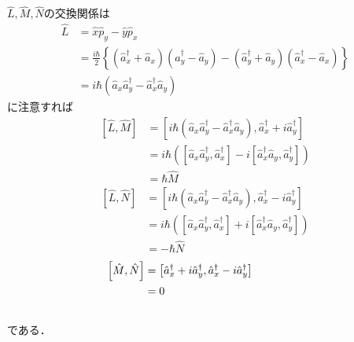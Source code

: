 \documentclass[a4paper,pdflatex,ja=standard]{bxjsarticle}
\begin{document}
\begin{enumerate}
  $\hat{L},\hat{M},\hat{N}$の交換関係は
  \begin{align}
    \hat{L}
    &=
    \hat{x}\hat{p}_{y}
    -
    \hat{y}\hat{p}_{x}
    \nonumber
    \\
    &=
    \frac{i\hbar}{2}\left\{
    (\hat{a}_{x}^{\dagger}+\hat{a}_{x})(\hat{a}_{y}^{\dagger}-\hat{a}_{y})
    -
    (\hat{a}_{y}^{\dagger}+\hat{a}_{y})(\hat{a}_{x}^{\dagger}-\hat{a}_{x})
    \right\}
    \nonumber
    \\
    &=
    i\hbar(\hat{a}_{x}\hat{a}_{y}^{\dagger}-\hat{a}_{x}^{\dagger}\hat{a}_{y})
    \label{ang_momentum}
  \end{align}
  に注意すれば
  \begin{align}
    \left[  
      \hat{L},\hat{M}
    \right]
    &=
    \left[  
      i\hbar(\hat{a}_{x}\hat{a}_{y}^{\dagger}-\hat{a}_{x}^{\dagger}\hat{a}_{y})
      ,
      \hat{a}_{x}^{\dagger}
      +i\hat{a}_{y}^{\dagger}
    \right]
    \nonumber
    \\
    &=
    i\hbar
    \left(  
      \left[ \hat{a}_{x}\hat{a}_{y}^{\dagger},\hat{a}_{x}^{\dagger} \right]
      -
      i\left[ \hat{a}_{x}^{\dagger}\hat{a}_{y},\hat{a}_{y}^{\dagger} \right]
    \right)
    \nonumber
    \\
    &=
    \hbar\hat{M}
  \end{align}
  \begin{align}
    \left[  
      \hat{L},\hat{N}
    \right]
    &=
    \left[  
      i\hbar
      (\hat{a}_{x}\hat{a}_{y}^{\dagger}-\hat{a}_{x}^{\dagger}\hat{a}_{y})
      ,
      \hat{a}_{x}^{\dagger}
      -i\hat{a}_{y}^{\dagger}
    \right]
    \nonumber
    \\
    &=
    i\hbar
    \left(  
      \left[ \hat{a}_{x}\hat{a}_{y}^{\dagger},\hat{a}_{x}^{\dagger} \right]
      +
      i\left[ \hat{a}_{x}^{\dagger}\hat{a}_{y},\hat{a}_{y}^{\dagger} \right]
    \right)
    \nonumber
    \\
    &=
    -\hbar\hat{N}
  \end{align}
  \begin{align}
    \left[ \hat{M},\hat{N} \right]
    &=
    \left[  
      \hat{a}_{x}^{\dagger}
      +i\hat{a}_{y}^{\dagger}
      ,
      \hat{a}_{x}^{\dagger}
      -i\hat{a}_{y}^{\dagger}
    \right]
    \nonumber
    \\
    &=
    0
    \\
    &\nonumber
    \hphantom{=
    i\hbar
    \left(  
      -\left[ \hat{a}_{x}\hat{a}_{y}^{\dagger},\hat{a}_{x}^{\dagger} \right]
      +
      i\left[ \hat{a}_{x}^{\dagger}\hat{a}_{y},\hat{a}_{y}^{\dagger} \right]
    \right)}
  \end{align}
  である．


\end{enumerate}
\end{document}

